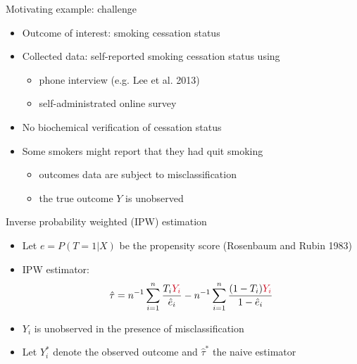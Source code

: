 \documentclass[12pt,aspectratio=169]{beamer}
\begin{document}
\begin{frame}{Motivating example: challenge}
 \begin{itemize}
\item Outcome of interest: smoking cessation status 
 
\item Collected data:  {\color{cred} self-reported} smoking cessation status using
\begin{itemize}
\item phone interview (e.g. Lee et al. 2013)
\item  self-administrated online  survey

\end{itemize}


\item {\color{cred} No biochemical verification} of cessation status


\item Some smokers might report that they had quit smoking

\begin{itemize}
\item outcomes data are subject to misclassification
\item the true outcome {\color{cred}  $Y$ is unobserved }
\end{itemize}
\end{itemize}
  \vfill
{\color{black!40}{\scriptsize Lee SM, Landry J, Jones PM, Buhrmann O, Morley-Forster P. The effectiveness of a perioperative smoking cessation program: a randomized clinical trial. Anesth Analg 2013;117(3):605-13.}}
\end{frame}




\begin{frame}{Inverse probability weighted (IPW) estimation}

\begin{itemize}

\item Let $e=P(T=1|X)$ be the propensity score (Rosenbaum and Rubin 1983)

\item IPW estimator:
\[
\hat\tau=n^{-1}\sum_{i=1}^n \dfrac{T_i{\color{cred}Y_i}}{\hat{e}_i}-n^{-1}\sum_{i=1}^n \dfrac{(1-T_i){\color{cred}Y_i}}{1-\hat{e}_i}
\]
  


\pause 
\item
$Y_i$ is unobserved in the presence of misclassification

\item Let $Y_i^\ast$ denote the observed outcome and $\hat\tau^\ast$ the naive estimator

\end{itemize}

  \vfill
{\color{black!40}{\scriptsize Rosenbaum PR, Rubin DB. The central role of the propensity score in observational studies for causal effects. Biometrika 1983;70(1):41-55.}}
\end{frame}
\end{document}
